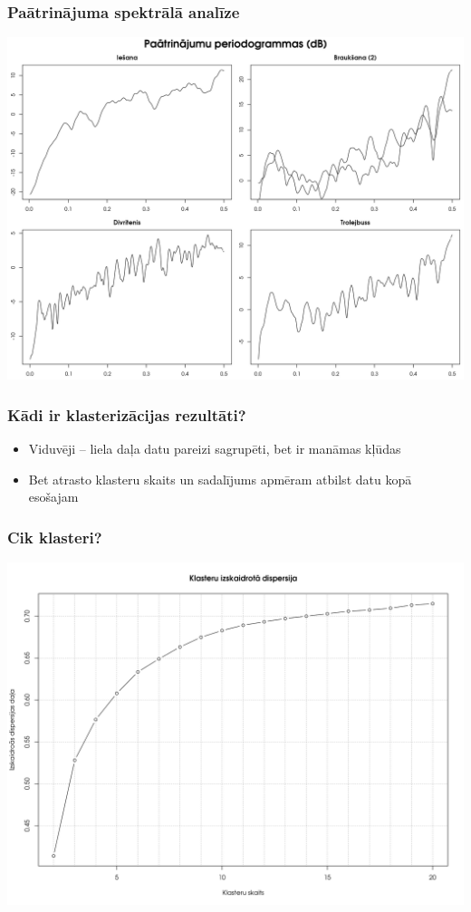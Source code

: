 \documentclass[xelatex,mathserif,serif]{beamer}
\newlength{\wideitemsep}
\let\olditem\item
\renewcommand{\item}{\setlength{\itemsep}{\wideitemsep}\olditem}
\begin{document}
\begin{frame}
  \frametitle{Paātrinājuma spektrālā analīze}
  \includegraphics[scale=0.3]{img/periodograms}
\end{frame}

\begin{frame}
  \frametitle{Kādi ir klasterizācijas rezultāti?}
  \begin{itemize}
    \item Viduvēji – liela daļa datu pareizi sagrupēti, bet ir manāmas kļūdas
    \item Bet atrasto klasteru skaits un sadalījums apmēram atbilst datu kopā esošajam
  \end{itemize}
\end{frame}

\begin{frame}
  \frametitle{Cik klasteri?}
  \includegraphics[scale=0.3]{img/kmeans_elbow}
\end{frame}
\end{document}
